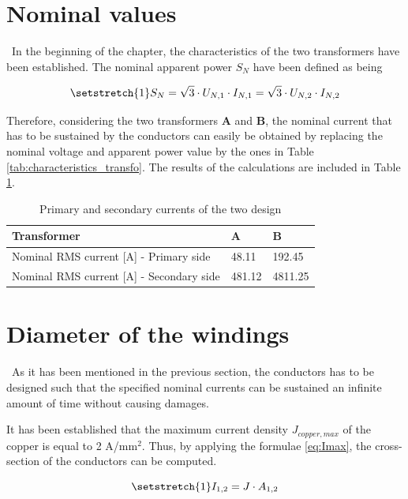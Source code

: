 \documentclass[12pt,a4paper]{report}
\begin{document}
\section{Nominal values}
\quad\, In the beginning of the chapter, the characteristics of the two transformers have been established. The nominal apparent power $S_N$ have been defined as being

\begin{equation}
\setstretch{1}
    S_N = \sqrt{3}\cdot U_{N,1}\cdot I_{N,1} = \sqrt{3}\cdot U_{N,2}\cdot I_{N,2}
\end{equation}

Therefore, considering the two transformers \textbf{A} and \textbf{B}, the nominal current that has to be sustained by the conductors can easily be obtained by replacing the nominal voltage and apparent power value by the ones in Table \ref{tab:characteristics_transfo}. The results of the calculations are included in Table \ref{tab:currents}.

\begin{table}[h]
    \centering
    \begin{tabular}{l|ll}
    Transformer                                  & \textbf{A} & \textbf{B} \\ \hline
    Nominal RMS current [A] - Primary side   & 48.11                       & 192.45                      \\
    Nominal RMS current [A] - Secondary side & 481.12                      & 4811.25                    
    \end{tabular}
    \caption{Primary and secondary currents of the two design}
    \label{tab:currents}
\end{table}


\section{Diameter of the windings}\label{diameter}
\quad\, As it has been mentioned in the previous section, the conductors has to be designed such that the specified nominal currents can be sustained an infinite amount of time without causing damages.

It has been established that the maximum current density $J_{copper,max}$ of the copper is equal to 2 A/mm$^2$. Thus, by applying the formulae \ref{eq:Imax}, the cross-section of the conductors can be computed.

 \begin{equation}
 \setstretch{1}
    I_{1,2} =  J \cdot A_{1,2}\label{eq:Imax}
\end{equation}
\end{document}
